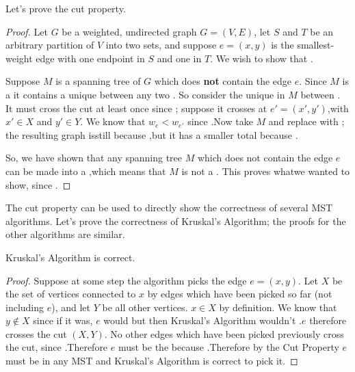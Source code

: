 \documentclass{tufte-handout}
\begin{document}
Let's prove the cut property.

\begin{proof}
  Let $G$ be a weighted, undirected graph $G = (V,E)$, let $S$ and $T$
  be an arbitrary partition of $V$ into two sets, and suppose
  $e = (x,y)$ is the smallest-weight edge with one endpoint in $S$ and
  one in $T$.  We wish to show that \blank.

  Suppose $M$ is a spanning tree of $G$ which does \textbf{not}
  contain the edge $e$.  Since $M$ is a \blank it contains a unique
  \blank\linebreak between any two \blank. So consider the unique
  \blank\linebreak in $M$ between \blank.   It must cross
  the cut at least once since\linebreak \mbox{} \blank; suppose it
  crosses at $e' = (x',y')$,\linebreak with $x' \in X$ and $y' \in Y$.
  We know that $w_e < w_{e'}$ since \blank.\linebreak Now take $M$ and
  replace \blank with \blank; the resulting graph is\linebreak still
  \blank because \blank,\linebreak but it has a smaller total \blank
  because \blank.

  So, we have shown that any spanning tree $M$ which does not contain
  the edge $e$ can be made into a \blank,\linebreak which means that
  $M$ is not a \blank. This proves what\linebreak we wanted to show, since
  \blank.
\end{proof}

The cut property can be used to directly show the correctness of
several MST algorithms.  Let's prove the correctness of Kruskal's
Algorithm; the proofs for the other algorithms are similar.

\begin{thm}
  Kruskal's Algorithm is correct.
\end{thm}

\begin{proof}
  Suppose at some step the algorithm picks the edge $e = (x,y)$.  Let
  $X$ be the set of vertices connected to $x$ by edges which have been
  picked so far (not including $e$), and let $Y$ be all other
  vertices. $x \in X$ by definition.  We know that $y \notin X$ since
  if it was, $e$ would \blank\linebreak but then Kruskal's Algorithm
  wouldn't \blank.\linebreak $e$ therefore crosses the cut $(X,Y)$. No
  other edges which have been picked previously cross the cut, since
  \blank.\linebreak Therefore $e$ must be the \blank\linebreak because
  \blank.\linebreak Therefore by the Cut Property $e$ must
  be in any MST and Kruskal's Algorithm is correct to pick it.
\end{proof}
\end{document}
